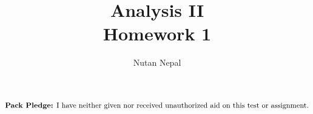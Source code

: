 \documentclass[12pt]{article}
\title{Analysis II \\
\large Homework 1
}
\author{Nutan Nepal}
\newcommand{\packpledge}{
    $\text{{\bf Pack Pledge:} I have neither given nor
    received unauthorized aid on this
    test or assignment.}$}
\begin{document}
\maketitle
\packpledge\\
\makebox[\linewidth]{\rule{200mm}{1pt}}
\vspace{1mm}


\newcommand{\mR}{\mathbb{R}}
\newcommand{\mN}{\mathbb{N}}
\newcommand{\mC}{\mathbb{C}}
\newcommand{\mQ}{\mathbb{Q}}
\newcommand{\mq}{\mathbb{Q}}
\newcommand{\cP}{\mathcal{P}}
\newcommand{\cB}{\mathcal{B}}
\newcommand{\cM}{\mathcal{M}}
\newcommand{\ds}{\displaystyle}
\newcommand{\al}{\alpha}
\newcommand{\li}{l^{\infty}}
\newcommand{\ep}{\varepsilon}
\newcommand{\de}{\delta}
\newcommand{\T}{\mathcal{T}}
\newcommand{\linf}{l^{\infty}}
\newcommand{\cD}{\mathcal{D}}
\newcommand{\cR}{\mathcal{R}}
\newcommand{\cN}{\mathcal{N}}
\newcommand{\lsn}{\limsup_{n \to \infty}}
\newcommand{\lin}{\liminf_{n \to \infty}}
\newcommand{\eq}{\Leftrightarrow}
\end{document}
